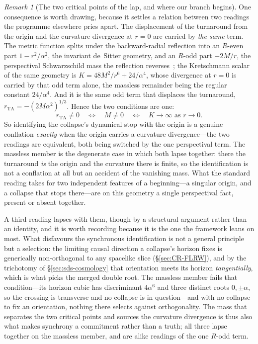 \documentclass[11pt,a4paper]{article}
\theoremstyle{plain}
\theoremstyle{definition}
\theoremstyle{remark}
\newtheorem{remark}{Remark}
\begin{document}
\begin{remark}[The two critical points of the lap, and where our branch begins]
One consequence is worth drawing, because it settles a relation between two readings the programme elsewhere pries apart. The displacement of the turnaround from the origin and the curvature divergence at $r=0$ are carried by \emph{the same} term. The metric function splits under the backward-radial reflection into an $R$-even part $1-r^{2}/\alpha^{2}$, the invariant de~Sitter geometry, and an $R$-odd part $-2M/r$, the perspectival Schwarzschild mass the reflection reverses~\cite{JanzenGroupoid}; the Kretschmann scalar of the same geometry is $K=48M^{2}/r^{6}+24/\alpha^{4}$, whose divergence at $r=0$ is carried by that odd term alone, the massless remainder being the regular constant $24/\alpha^{4}$. And it is the same odd term that displaces the turnaround, $r_{\mathrm{TA}}=-(2M\alpha^{2})^{1/3}$. Hence the two conditions are one:
\[
r_{\mathrm{TA}}\neq0
\quad\Longleftrightarrow\quad
M\neq0
\quad\Longleftrightarrow\quad
K\to\infty \text{ as } r\to0 .
\]
So identifying the collapse's dynamical stop with the origin is a genuine conflation \emph{exactly} when the origin carries a curvature divergence---the two readings are equivalent, both being switched by the one perspectival term. The massless member is the degenerate case in which both lapse together: there the turnaround \emph{is} the origin and the curvature there is finite, so the identification is not a conflation at all but an accident of the vanishing mass. What the standard reading takes for two independent features of a beginning---a singular origin, and a collapse that stops there---are on this geometry a single perspectival fact, present or absent together.

A third reading lapses with them, though by a structural argument rather than an identity, and it is worth recording because it is the one the framework leans on most. What disfavours the synchronous identification is not a general principle but a selection: the limiting causal direction a collapse's horizon fixes is generically non-orthogonal to any spacelike slice (\S\ref{sec:CR-FLRW}), and by the trichotomy of \S\ref{sec:sds-cosmology} that orientation meets its horizon \emph{tangentially}, which is what picks the merged double root. The massless member fails that condition---its horizon cubic has discriminant $4\alpha^{6}$ and three distinct roots $0,\pm\alpha$, so the crossing is transverse and no collapse is in question---and with no collapse to fix an orientation, nothing there selects against orthogonality. The mass that separates the two critical points and sources the curvature divergence is thus also what makes synchrony a commitment rather than a truth; all three lapse together on the massless member, and are alike readings of the one $R$-odd term.
\end{remark}
\end{document}
